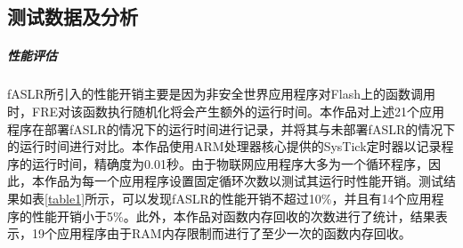 \documentclass[UTF8,12pt,a4paper]{ctexart}
\numberwithin{figure}{section}
\begin{document}
\subsection{测试数据及分析}

\subparagraph{性能评估}
\par fASLR所引入的性能开销主要是因为非安全世界应用程序对Flash上的函数调用时，FRE对该函数执行随机化将会产生额外的运行时间。本作品对上述21个应用程序在部署fASLR的情况下的运行时间进行记录，并将其与未部署fASLR的情况下的运行时间进行对比。本作品使用ARM处理器核心提供的SysTick定时器以记录程序的运行时间，精确度为0.01秒。由于物联网应用程序大多为一个循环程序，因此，本作品为每一个应用程序设置固定循环次数以测试其运行时性能开销。测试结果如表\ref{table1}所示，可以发现fASLR的性能开销不超过10\%，并且有14个应用程序的性能开销小于5\%。此外，本作品对函数内存回收的次数进行了统计，结果表示，19个应用程序由于RAM内存限制而进行了至少一次的函数内存回收。
\end{document}
